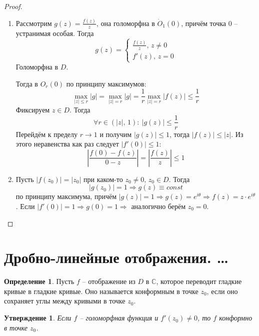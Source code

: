 \documentclass[a4paper,12pt]{article}
\renewcommand{\leq}{\ensuremath{\leqslant}}
\theoremstyle{plain}
\newtheorem{proposition}{Утверждение}[section]
\theoremstyle{definition}
\newtheorem{definition}{Определение}[section]
\theoremstyle{remark}
\begin{document}
\begin{proof}
	\begin{enumerate}
		\item Рассмотрим $g(z) = \frac{f(z)}{z}$, она голоморфна в $\dot{O}_1(0)$, причём точка $0$ -- устранимая особая. Тогда
		      \[
			      g(z) = \begin{cases}
				      \frac{f(z)}{z},\, z \neq 0 \\
				      f'(z),\, z = 0
			      \end{cases}
		      \]
		      Голоморфна в $D$.

		      Тогда в $O_r(0)$ по принципу максимумов:
		      \[
			      \max_{\vert z\vert \leq r} \vert g\vert = \max_{\vert z\vert = r}\vert g\vert = \frac{1}{r}\max_{\vert z\vert = r} \vert f(z)\vert \leq \frac{1}{r}
		      \]
		      Фиксируем $z \in D$. Тогда
		      \[
			      \forall r \in (\vert z\vert,\, 1) :\: \vert g(z)\vert \leq \frac{1}{r}
		      \]
		      Перейдём к пределу $r \to 1$ и получим $\vert g(z)\vert \leq 1$, тогда $\vert f(z)\vert \leq \vert z\vert$. Из этого неравенства как раз следует $\vert f'(0)\vert \leq 1$:
		      \[
			      \left\vert \frac{f(0) - f(z)}{0 - z}\right\vert = \left\vert \frac{f(z)}{z}\right\vert \leq 1
		      \]
		\item Пусть $\vert f(z_0)\vert = \vert z_0\vert$ при каком-то $z_0 \neq 0,\, z_0 \in D$. Тогда
		      \[
			      \vert g(z_0)\vert = 1\Rightarrow g(z) \equiv const
		      \]
		      по принципу максимума, причём $\vert g(z)\vert = 1 \Rightarrow g(z) = e^{i\theta} \Rightarrow f(z) = z\cdot e^{i\theta}$. Если $\vert f'(0)\vert = 1 \Rightarrow g(0) = 1 \Rightarrow$ аналогично берём $z_0 = 0$.
	\end{enumerate}
\end{proof}

\section{Дробно-линейные отображения. \dots}
\begin{definition}
	Пусть $f$ -- отображение из $D$ в $\mathbb{C}$, которое переводит гладкие кривые в гладкие кривые. Оно называется конформным в точке $z_0$, если оно сохраняет углы между кривыми в точке $z_0$.
\end{definition}

\begin{proposition}
	Если $f$ -- голоморфная функция и $f'(z_0) \neq 0$, то $f$ конформно в точке $z_0$.
\end{proposition}
\end{document}
